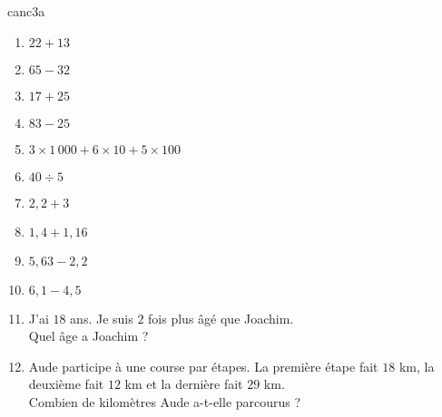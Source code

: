 \begin{EXO}{}{canc3a}

\begin{multicols}{2}
\begin{enumerate}[itemsep=1em, label=\arabic*)]
	\item \begin{minipage}[t]{\linewidth} $22+13$ \end{minipage}
	\item \begin{minipage}[t]{\linewidth} $65-32$ \end{minipage}
	\item \begin{minipage}[t]{\linewidth} $17+25$ \end{minipage}
	\item \begin{minipage}[t]{\linewidth} $83-25$ \end{minipage}
	\item \begin{minipage}[t]{\linewidth} $3\times 1\,000 + 6\times 10 + 5\times 100$ \end{minipage}
	\item \begin{minipage}[t]{\linewidth} $40\div5$ \end{minipage}
	\item \begin{minipage}[t]{\linewidth} $2{,}2+3$ \end{minipage}
	\item \begin{minipage}[t]{\linewidth} $1{,}4+1{,}16$ \end{minipage}
	\item \begin{minipage}[t]{\linewidth} $5{,}63-2{,}2$ \end{minipage}
	\item \begin{minipage}[t]{\linewidth} $6{,}1-4{,}5$ \end{minipage}
	\item \begin{minipage}[t]{\linewidth} J'ai $18$ ans. Je suis $2$ fois plus âgé que Joachim.\\Quel âge a Joachim ? \end{minipage}
	\item \begin{minipage}[t]{\linewidth} Aude participe à une course par étapes. La première étape fait $18$ km, la deuxième fait $12$ km et la dernière fait $29$ km.\\Combien de kilomètres Aude a-t-elle parcourus ? \end{minipage}

\end{enumerate}
\end{multicols}
\end{EXO}
